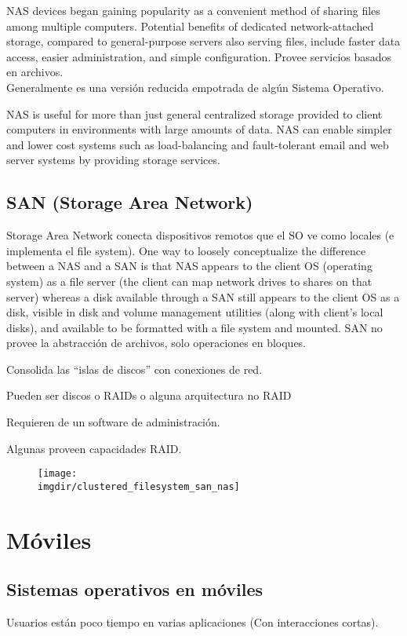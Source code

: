 \documentclass[a4paper, twoside]{article}
\newcommand{\imgdir}{../resources/images} %
\begin{document}
NAS devices began gaining popularity as a convenient method of sharing files among multiple computers. Potential benefits of dedicated network-attached storage, compared to general-purpose servers also serving files, include faster data access, easier administration, and simple configuration. Provee servicios basados en archivos.\\

Generalmente es una versión reducida empotrada de algún Sistema Operativo.

NAS is useful for more than just general centralized storage provided to client computers in environments with large amounts of data. NAS can enable simpler and lower cost systems such as load-balancing and fault-tolerant email and web server systems by providing storage services.

\subsection{SAN (Storage Area Network)}
Storage Area Network conecta dispositivos remotos que el SO ve como locales (e implementa el file system).
One way to loosely conceptualize the difference between a NAS and a SAN is that NAS appears to the client OS (operating system) as a file server (the client can map network drives to shares on that server) whereas a disk available through a SAN still appears to the client OS as a disk, visible in disk and volume management utilities (along with client's local disks), and available to be formatted with a file system and mounted. SAN no provee la abstracción de archivos, solo operaciones en bloques.

Consolida las ``islas de discos'' con conexiones de red.

Pueden ser discos o RAIDs o alguna arquitectura no RAID

Requieren de un software de administración.

Algunas proveen capacidades RAID.

\begin{figure}[h]
	\centering
	\texttt{[image: \\imgdir/clustered\_filesystem\_san\_nas]}
	\label{fig:clustered_filesystem_san_nas}
\end{figure}

\newpage
\section{Móviles}
\subsection{Sistemas operativos en móviles}
Usuarios están poco tiempo en varias aplicaciones (Con interacciones cortas).
\end{document}
